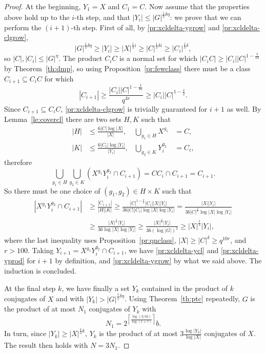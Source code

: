 \documentclass[a4paper]{article}
\theoremstyle{definition}
\numberwithin{equation}{section}
\begin{document}
\begin{proof}
At the beginning, $Y_{1}=X$ and $C_{1}=C$. Now assume that the properties above hold up to the $i$-th step, and that $|Y_{i}|\leq|G|^{\frac{1}{3}\delta\eta}$: we prove that we can perform the $(i+1)$-th step. First of all, by \eqref{pr:xcldelta-ygrow} and \eqref{pr:xcldelta-clgrow},
\begin{equation*}
|G|^{\frac{1}{3}\delta\eta}\geq|Y_{i}|\geq|X|^{\frac{1}{3}i}\geq|C|^{\frac{1}{3}\delta i}\geq|C_{i}|^{\frac{1}{3}\delta},
\end{equation*}
so $|C|,|C_{i}|\leq|G|^{\eta}$. The product $C_{i}C$ is a normal set for which $|C_{i}C|\geq|C_{i}||C|^{1-\frac{\delta}{10}}$ by Theorem~\ref{th:dmp}, so using Proposition~\ref{pr:fewclass} there must be a class $C_{i+1}\subseteq C_{i}C$ for which
\begin{equation*}
|C_{i+1}|\geq\frac{|C_{i}||C|^{1-\frac{\delta}{10}}}{q^{4r}}\geq|C_{i}||C|^{1-\frac{\delta}{2}}.
\end{equation*}
Since $C_{i+1}\subseteq C_{i}C$, \eqref{pr:xcldelta-clgrow} is trivially guaranteed for $i+1$ as well. By Lemma~\ref{le:covercl} there are two sets $H,K$ such that
\begin{align*}
|H| & \leq\frac{6|C|\log|X|}{|X|}, & \bigcup_{g_{1}\in H}X^{g_{1}} & =C, \\
|K| & \leq\frac{6|C_{i}|\log|Y_{i}|}{|Y_{i}|}, & \bigcup_{g_{2}\in K}Y_{i}^{g_{2}} & =C_{i},
\end{align*}
therefore
\begin{equation*}
\bigcup_{g_{1}\in H}\bigcup_{g_{2}\in K}(X^{g_{1}}Y_{i}^{g_{2}}\cap C_{i+1})=CC_{i}\cap C_{i+1}=C_{i+1}.
\end{equation*}
So there must be one choice of $(g_{1},g_{2})\in H\times K$ such that
\begin{align*}
|X^{g_{1}}Y_{i}^{g_{2}}\cap C_{i+1}| & \geq\frac{|C_{i+1}|}{|H||K|}\geq\frac{|C|^{1-\frac{\delta}{2}}|C_{i}||X||Y_{i}|}{36|C||C_{i}|\log|X|\log|Y_{i}|}=\frac{|X||Y_{i}|}{36|C|^{\frac{\delta}{2}}\log|X|\log|Y_{i}|} \\
& \geq\frac{|X|^{\frac{1}{2}}|Y_{i}|}{36\log|X|\log|Y_{i}|}\geq\frac{|X|^{\frac{1}{2}}|Y_{i}|}{36(\log|G|)^{2}}\geq|X|^{\frac{1}{3}}|Y_{i}|,
\end{align*}
where the last inequality uses Proposition~\ref{pr:qnclass}, $|X|\geq|C|^{\delta}\geq q^{10r}$, and $r>100$. Taking $Y_{i+1}=X^{g_{1}}Y_{i}^{g_{2}}\cap C_{i+1}$, we have \eqref{pr:xcldelta-ycl} and \eqref{pr:xcldelta-yprod} for $i+1$ by definition, and \eqref{pr:xcldelta-ygrow} by what we said above. The induction is concluded.

At the final step $k$, we have finally a set $Y_{k}$ contained in the product of $k$ conjugates of $X$ and with $|Y_{k}|>|G|^{\frac{1}{3}\delta\eta}$. Using Theorem~\ref{th:ptc} repeatedly, $G$ is the product of at most $N_{1}$ conjugates of $Y_{k}$ with
\begin{equation*}
N_{1}=2^{\left\lceil\frac{\log(3/\delta\eta)}{\log(1+\tau)}\right\rceil}b.
\end{equation*}
In turn, since $|Y_{k}|\geq|X|^{\frac{1}{3}k}$, $Y_{k}$ is the product of at most $3\frac{\log|Y_{k}|}{\log|X|}$ conjugates of $X$. The result then holds with $N=3N_{1}$.
\end{proof}
\end{document}
